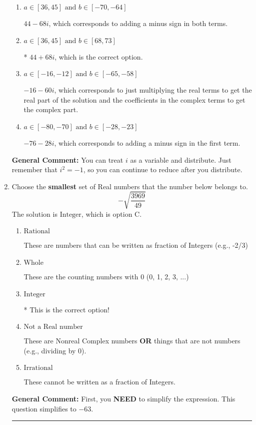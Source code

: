 \documentclass{extbook}[14pt]
\newcommand{\litem}[1]{\item #1

\rule{\textwidth}{0.4pt}}
\begin{document}
\begin{enumerate}
{\begin{enumerate}[label=\Alph*.]
 $-76 + 28 i$, which corresponds to adding a minus sign in the second term.
\item \( a \in [36, 45] \text{ and } b \in [-70, -64] \)

 $44 - 68 i$, which corresponds to adding a minus sign in both terms.
\item \( a \in [36, 45] \text{ and } b \in [68, 73] \)

* $44 + 68 i$, which is the correct option.
\item \( a \in [-16, -12] \text{ and } b \in [-65, -58] \)

 $-16 - 60 i$, which corresponds to just multiplying the real terms to get the real part of the solution and the coefficients in the complex terms to get the complex part.
\item \( a \in [-80, -70] \text{ and } b \in [-28, -23] \)

 $-76 - 28 i$, which corresponds to adding a minus sign in the first term.
\end{enumerate}

\textbf{General Comment:} You can treat $i$ as a variable and distribute. Just remember that $i^2=-1$, so you can continue to reduce after you distribute.
}
\litem{
Choose the \textbf{smallest} set of Real numbers that the number below belongs to.
\[ -\sqrt{\frac{3969}{49}} \]The solution is \( \text{Integer} \), which is option C.\begin{enumerate}[label=\Alph*.]
\item \( \text{Rational} \)

These are numbers that can be written as fraction of Integers (e.g., -2/3)
\item \( \text{Whole} \)

These are the counting numbers with 0 (0, 1, 2, 3, ...)
\item \( \text{Integer} \)

* This is the correct option!
\item \( \text{Not a Real number} \)

These are Nonreal Complex numbers \textbf{OR} things that are not numbers (e.g., dividing by 0).
\item \( \text{Irrational} \)

These cannot be written as a fraction of Integers.
\end{enumerate}

\textbf{General Comment:} First, you \textbf{NEED} to simplify the expression. This question simplifies to $-63$. 
 
}
\end{enumerate}
\end{document}
